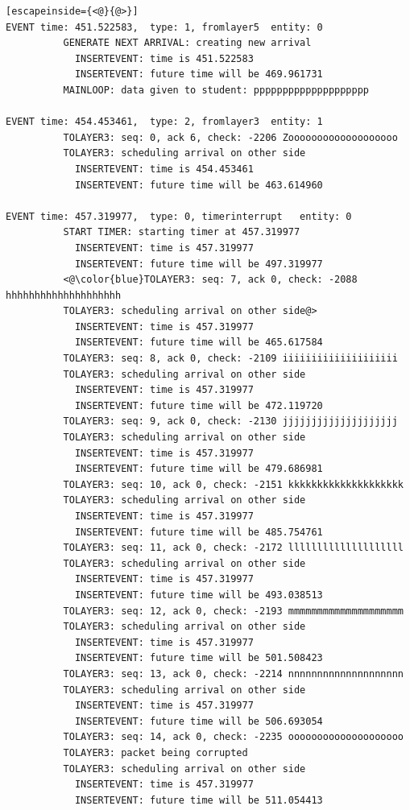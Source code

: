 \documentclass[paper=a4, fontsize=11pt]{scrartcl}
\numberwithin{equation}{section}		%
\numberwithin{figure}{section}			%
\numberwithin{table}{section}				%
\begin{document}
\begin{lstlisting}[escapeinside={<@}{@>}]
EVENT time: 451.522583,  type: 1, fromlayer5  entity: 0
          GENERATE NEXT ARRIVAL: creating new arrival
            INSERTEVENT: time is 451.522583
            INSERTEVENT: future time will be 469.961731
          MAINLOOP: data given to student: pppppppppppppppppppp

EVENT time: 454.453461,  type: 2, fromlayer3  entity: 1
          TOLAYER3: seq: 0, ack 6, check: -2206 Zooooooooooooooooooo
          TOLAYER3: scheduling arrival on other side
            INSERTEVENT: time is 454.453461
            INSERTEVENT: future time will be 463.614960

EVENT time: 457.319977,  type: 0, timerinterrupt   entity: 0
          START TIMER: starting timer at 457.319977
            INSERTEVENT: time is 457.319977
            INSERTEVENT: future time will be 497.319977
          <@\color{blue}TOLAYER3: seq: 7, ack 0, check: -2088 hhhhhhhhhhhhhhhhhhhh
          TOLAYER3: scheduling arrival on other side@>
            INSERTEVENT: time is 457.319977
            INSERTEVENT: future time will be 465.617584
          TOLAYER3: seq: 8, ack 0, check: -2109 iiiiiiiiiiiiiiiiiiii
          TOLAYER3: scheduling arrival on other side
            INSERTEVENT: time is 457.319977
            INSERTEVENT: future time will be 472.119720
          TOLAYER3: seq: 9, ack 0, check: -2130 jjjjjjjjjjjjjjjjjjjj
          TOLAYER3: scheduling arrival on other side
            INSERTEVENT: time is 457.319977
            INSERTEVENT: future time will be 479.686981
          TOLAYER3: seq: 10, ack 0, check: -2151 kkkkkkkkkkkkkkkkkkkk
          TOLAYER3: scheduling arrival on other side
            INSERTEVENT: time is 457.319977
            INSERTEVENT: future time will be 485.754761
          TOLAYER3: seq: 11, ack 0, check: -2172 llllllllllllllllllll
          TOLAYER3: scheduling arrival on other side
            INSERTEVENT: time is 457.319977
            INSERTEVENT: future time will be 493.038513
          TOLAYER3: seq: 12, ack 0, check: -2193 mmmmmmmmmmmmmmmmmmmm
          TOLAYER3: scheduling arrival on other side
            INSERTEVENT: time is 457.319977
            INSERTEVENT: future time will be 501.508423
          TOLAYER3: seq: 13, ack 0, check: -2214 nnnnnnnnnnnnnnnnnnnn
          TOLAYER3: scheduling arrival on other side
            INSERTEVENT: time is 457.319977
            INSERTEVENT: future time will be 506.693054
          TOLAYER3: seq: 14, ack 0, check: -2235 oooooooooooooooooooo
          TOLAYER3: packet being corrupted
          TOLAYER3: scheduling arrival on other side
            INSERTEVENT: time is 457.319977
            INSERTEVENT: future time will be 511.054413


\end{lstlisting}
\end{document}
